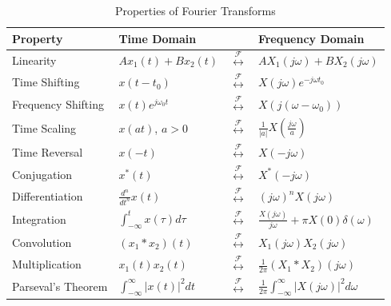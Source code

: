 \begin{table}[ht]
    \centering
    \caption{Properties of Fourier Transforms}
    \label{tab:fourier_transform_properties}
    \begin{tabular}{llll}
        \toprule
        \textbf{Property}  & \textbf{Time Domain}                &                                          & \textbf{Frequency Domain}                                     \\
        \midrule
        Linearity          & $A x_1(t) + B x_2(t)$               & $\overset{\mathcal{F}}{\leftrightarrow}$ & $A X_1(j\omega) + B X_2(j\omega)$                             \\[1mm]
        Time Shifting      & $x(t - t_0)$                        & $\overset{\mathcal{F}}{\leftrightarrow}$ & $X(j\omega)e^{-j\omega t_0}$                                  \\[1mm]
        Frequency Shifting & $x(t)e^{j\omega_0 t}$               & $\overset{\mathcal{F}}{\leftrightarrow}$ & $X(j(\omega - \omega_0))$                                     \\[1mm]
        Time Scaling       & $x(at)$, $a > 0$                    & $\overset{\mathcal{F}}{\leftrightarrow}$ & $\frac{1}{|a|}X\left(\frac{j\omega}{a}\right)$                \\[1mm]
        Time Reversal      & $x(-t)$                             & $\overset{\mathcal{F}}{\leftrightarrow}$ & $X(-j\omega)$                                                 \\[1mm]
        Conjugation        & $x^*(t)$                            & $\overset{\mathcal{F}}{\leftrightarrow}$ & $X^*(-j\omega)$                                               \\[1mm]
        Differentiation    & $\frac{d^n}{dt^n}x(t)$              & $\overset{\mathcal{F}}{\leftrightarrow}$ & $(j\omega)^n X(j\omega)$                                      \\[1mm]
        Integration        & $\int_{-\infty}^t x(\tau) d\tau$    & $\overset{\mathcal{F}}{\leftrightarrow}$ & $\frac{X(j\omega)}{j\omega} + \pi X(0)\delta(\omega)$         \\[1mm]
        Convolution        & $(x_1 * x_2)(t)$                    & $\overset{\mathcal{F}}{\leftrightarrow}$ & $X_1(j\omega) X_2(j\omega)$                                   \\[1mm]
        Multiplication     & $x_1(t)x_2(t)$                      & $\overset{\mathcal{F}}{\leftrightarrow}$ & $\frac{1}{2\pi}(X_1 * X_2)(j\omega)$                          \\[1mm]
        Parseval's Theorem & $\int_{-\infty}^\infty |x(t)|^2 dt$ & $\overset{\mathcal{F}}{\leftrightarrow}$ & $\frac{1}{2\pi} \int_{-\infty}^\infty |X(j\omega)|^2 d\omega$ \\
        \bottomrule
    \end{tabular}
\end{table}

